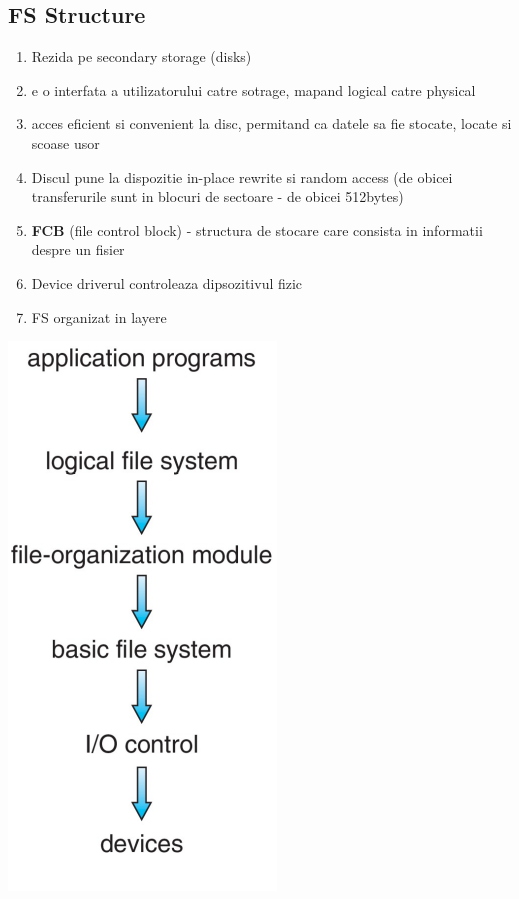 \documentclass{article}
\begin{document}
\subsection*{FS Structure}
\begin{enumerate}
    \item Rezida pe secondary storage (disks)
    \item e o interfata a utilizatorului catre sotrage, mapand logical catre physical
    \item acces eficient si convenient la disc, permitand ca datele sa fie stocate, locate si scoase usor
    \item Discul pune la dispozitie in-place rewrite si random access (de obicei transferurile sunt in blocuri de sectoare - de obicei 512bytes)
    \item \textbf{FCB} (file control block) - structura de stocare care consista in informatii despre un fisier
    \item Device driverul controleaza dipsozitivul fizic
    \item FS organizat in layere
\end{enumerate}

\begin{center}
    \includegraphics[scale=0.4]{47-layeredfs.png}
\end{center}
\end{document}
